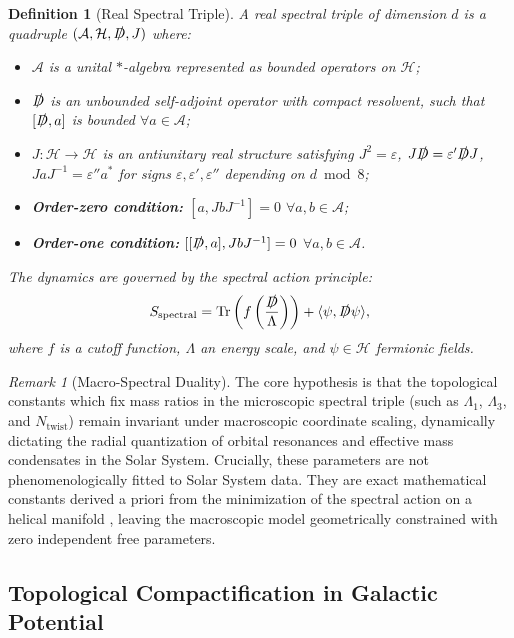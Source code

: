 \documentclass[11pt,a4paper]{article}
\newtheorem{definition}[theorem]{Definition}
\theoremstyle{remark}
\newtheorem{remark}[theorem]{Remark}
\newcommand{\cH}{\mathcal{H}}
\newcommand{\cA}{\mathcal{A}}
\newcommand{\slashedD}{\slashed{D}}
\begin{document}
\begin{definition}[Real Spectral Triple]
\label{def:spectral_triple}
A real spectral triple of dimension $d$ is a quadruple $(\cA, \cH, \slashedD, J)$ where:
\begin{itemize}
    \item $\cA$ is a unital $*$-algebra represented as bounded operators on $\cH$;
    \item $\slashedD$ is an unbounded self-adjoint operator with compact resolvent, such that $[\slashedD, a]$ is bounded $\forall a \in \cA$;
    \item $J: \cH \to \cH$ is an antiunitary real structure satisfying $J^2 = \varepsilon$, $J\slashedD = \varepsilon' \slashedD J$, $JaJ^{-1} = \varepsilon'' a^*$ for signs $\varepsilon, \varepsilon', \varepsilon''$ depending on $d \bmod 8$;
    \item \textbf{Order-zero condition:} $[a, JbJ^{-1}] = 0$ $\forall a,b \in \cA$;
    \item \textbf{Order-one condition:} $[[\slashedD, a], JbJ^{-1}] = 0$ $\forall a,b \in \cA$.
\end{itemize}
The dynamics are governed by the spectral action principle:
\begin{equation}
    S_{\text{spectral}} = \mathrm{Tr}\left(f\left(\frac{\slashedD}{\Lambda}\right)\right) + \langle \psi, \slashedD \psi \rangle,
\end{equation}
where $f$ is a cutoff function, $\Lambda$ an energy scale, and $\psi \in \cH$ fermionic fields.
\end{definition}

\begin{remark}[Macro-Spectral Duality]
The core hypothesis is that the topological constants which fix mass ratios in the microscopic spectral triple (such as $\Lambda_1$, $\Lambda_3$, and $N_{\text{twist}}$) remain invariant under macroscopic coordinate scaling, dynamically dictating the radial quantization of orbital resonances and effective mass condensates in the Solar System. Crucially, these parameters are not phenomenologically fitted to Solar System data. They are exact mathematical constants derived a priori from the minimization of the spectral action on a helical manifold \cite{logvinovich2026}, leaving the macroscopic model geometrically constrained with zero independent free parameters.
\end{remark}

\subsection{Topological Compactification in Galactic Potential}
\end{document}
